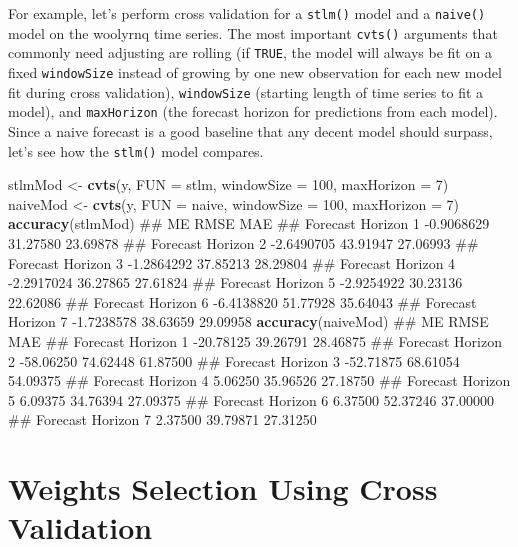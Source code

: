 \documentclass[]{book}
\newenvironment{Shaded}{\begin{snugshade}}{\end{snugshade}}
\newcommand{\KeywordTok}[1]{\textcolor[rgb]{0.13,0.29,0.53}{\textbf{#1}}}
\newcommand{\DataTypeTok}[1]{\textcolor[rgb]{0.13,0.29,0.53}{#1}}
\newcommand{\DecValTok}[1]{\textcolor[rgb]{0.00,0.00,0.81}{#1}}
\newcommand{\StringTok}[1]{\textcolor[rgb]{0.31,0.60,0.02}{#1}}
\newcommand{\NormalTok}[1]{#1}
\begin{document}
For example, let's perform cross validation for a \texttt{stlm()} model
and a \texttt{naive()} model on the woolyrnq time series. The most
important \texttt{cvts()} arguments that commonly need adjusting are
rolling (if \texttt{TRUE}, the model will always be fit on a fixed
\texttt{windowSize} instead of growing by one new observation for each
new model fit during cross validation), \texttt{windowSize} (starting
length of time series to fit a model), and \texttt{maxHorizon} (the
forecast horizon for predictions from each model). Since a naive
forecast is a good baseline that any decent model should surpass, let's
see how the \texttt{stlm()} model compares.

\begin{Shaded}
\begin{Highlighting}[]
\NormalTok{stlmMod <-}\StringTok{ }\KeywordTok{cvts}\NormalTok{(y, }\DataTypeTok{FUN =}\NormalTok{ stlm, }\DataTypeTok{windowSize =} \DecValTok{100}\NormalTok{, }\DataTypeTok{maxHorizon =} \DecValTok{7}\NormalTok{)}
\NormalTok{naiveMod <-}\StringTok{ }\KeywordTok{cvts}\NormalTok{(y, }\DataTypeTok{FUN =}\NormalTok{ naive, }\DataTypeTok{windowSize =} \DecValTok{100}\NormalTok{, }\DataTypeTok{maxHorizon =} \DecValTok{7}\NormalTok{)}
\KeywordTok{accuracy}\NormalTok{(stlmMod)}
\NormalTok{##                             ME     RMSE      MAE}
\NormalTok{## Forecast Horizon  1 -0.9068629 31.27580 23.69878}
\NormalTok{## Forecast Horizon  2 -2.6490705 43.91947 27.06993}
\NormalTok{## Forecast Horizon  3 -1.2864292 37.85213 28.29804}
\NormalTok{## Forecast Horizon  4 -2.2917024 36.27865 27.61824}
\NormalTok{## Forecast Horizon  5 -2.9254922 30.23136 22.62086}
\NormalTok{## Forecast Horizon  6 -6.4138820 51.77928 35.64043}
\NormalTok{## Forecast Horizon  7 -1.7238578 38.63659 29.09958}
\KeywordTok{accuracy}\NormalTok{(naiveMod)}
\NormalTok{##                            ME     RMSE      MAE}
\NormalTok{## Forecast Horizon  1 -20.78125 39.26791 28.46875}
\NormalTok{## Forecast Horizon  2 -58.06250 74.62448 61.87500}
\NormalTok{## Forecast Horizon  3 -52.71875 68.61054 54.09375}
\NormalTok{## Forecast Horizon  4   5.06250 35.96526 27.18750}
\NormalTok{## Forecast Horizon  5   6.09375 34.76394 27.09375}
\NormalTok{## Forecast Horizon  6   6.37500 52.37246 37.00000}
\NormalTok{## Forecast Horizon  7   2.37500 39.79871 27.31250}
\end{Highlighting}
\end{Shaded}

\section{Weights Selection Using Cross
Validation}\label{weights-selection-using-cross-validation}
\end{document}

